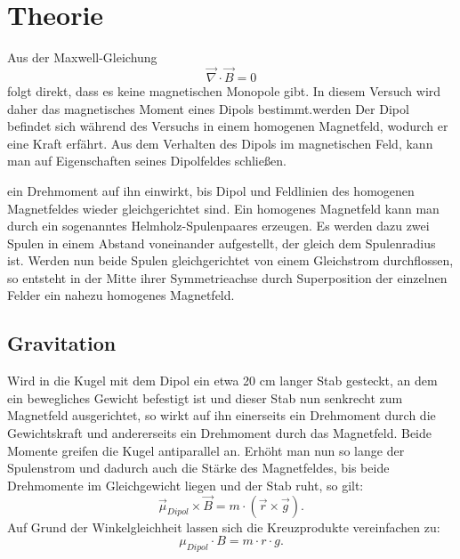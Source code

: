 \newpage					%




\section{Theorie}
Aus der Maxwell-Gleichung
\begin{equation}
\vec{\nabla} \cdot \vec{B} = 0
\end{equation}
 folgt direkt, dass es keine magnetischen Monopole gibt. In diesem Versuch wird daher das magnetisches Moment eines Dipols bestimmt.werden
 Der Dipol befindet sich während des Versuchs in einem homogenen Magnetfeld, wodurch er eine Kraft erfährt. Aus dem Verhalten des Dipols im magnetischen Feld, kann man auf Eigenschaften seines Dipolfeldes schließen.
 
 
 ein Drehmoment auf ihn einwirkt, bis Dipol und Feldlinien des homogenen Magnetfeldes wieder gleichgerichtet sind.
 Ein homogenes Magnetfeld kann man durch ein sogenanntes Helmholz-Spulenpaares erzeugen. Es werden dazu zwei Spulen in einem Abstand voneinander aufgestellt, der gleich dem Spulenradius ist. Werden nun beide Spulen gleichgerichtet von einem Gleichstrom durchflossen, so entsteht in der Mitte ihrer Symmetrieachse durch Superposition der einzelnen Felder ein nahezu homogenes Magnetfeld.
 
 \subsection{Gravitation}
 Wird in die Kugel mit dem Dipol ein etwa 20 cm langer Stab gesteckt, an dem ein bewegliches Gewicht befestigt ist und dieser Stab nun senkrecht zum Magnetfeld ausgerichtet, so wirkt auf ihn einerseits ein Drehmoment durch die Gewichtskraft und andererseits ein Drehmoment durch das Magnetfeld. Beide Momente greifen die Kugel antiparallel an. Erhöht man nun so lange der Spulenstrom und dadurch auch die Stärke des Magnetfeldes, bis beide Drehmomente im Gleichgewicht liegen und der Stab ruht,
so gilt:
\begin{equation}
\vec{\mu}_{Dipol} \times \vec{B} = m\cdot (\vec{r} \times \vec{g} ).
\end{equation}
Auf Grund der Winkelgleichheit lassen sich die Kreuzprodukte vereinfachen zu:
\begin{equation}
\mu_{Dipol} \cdot B = m\cdot r \cdot g.
\label{grav}
\end{equation}
  
